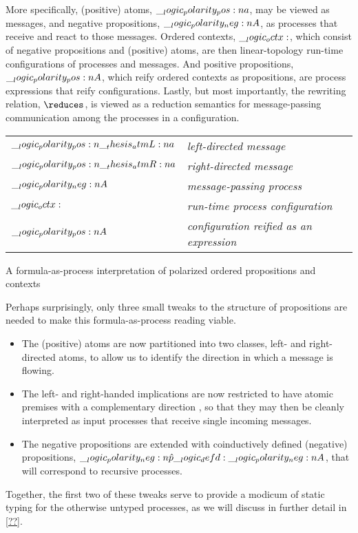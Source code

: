 More specifically,
(positive) atoms, $\__logic_polarity_pos:n {a}$, may be viewed as messages, and negative propositions, $\__logic_polarity_neg:n {A}$, as processes that receive and react to those messages.
Ordered contexts, $\__logic_octx:$, which consist of negative propositions and (positive) atoms, are then linear-topology run-time configurations of processes and messages.
And positive propositions, $\__logic_polarity_pos:n {A}$, which reify ordered contexts as propositions, are process expressions that reify configurations.
Lastly, but most importantly, the rewriting relation, $\reduces$, is viewed as a reduction semantics for message-passing communication among the processes in a configuration.%
\begin{margintable}
  \begin{center}
    \begin{tabular}{@{}l@{\enspace\ }>{\itshape}l@{}}
      $\__logic_polarity_pos:n {\__thesis_atmL:n {a}}$ & left-directed message \\
      $\__logic_polarity_pos:n {\__thesis_atmR:n {a}}$ & right-directed message \\
      $\__logic_polarity_neg:n {A}$ & message-passing process \\
      $\__logic_octx:$ & run-time process configuration \\
      $\__logic_polarity_pos:n {A}$ & configuration reified as an expression
    \end{tabular}
  \end{center}
  \caption{A formula-as-process interpretation of polarized ordered propositions and contexts}\label{fig:choreographies:propctx-table}
\end{margintable}%

Perhaps surprisingly, only three small tweaks to the structure of propositions are needed to make this formula-as-process reading viable.
\begin{itemize}
\item
  The (positive) atoms are now partitioned into two classes, left- and right-directed atoms, to allow us to identify the direction in which a message is flowing.

\item
  The left- and right-handed implications are now restricted to have atomic premises with a complementary direction
  , so that they may then be cleanly interpreted as input processes that receive  single incoming messages.

\item 
  The negative propositions are extended with coinductively defined (negative) propositions, $\__logic_polarity_neg:n {\hat{p}} \__logic_defd: \__logic_polarity_neg:n {A}$, that will correspond to recursive processes.
\end{itemize}
Together, the first two of these tweaks serve to provide a modicum of static typing for the otherwise untyped processes, as we will discuss in further detail in \cref{??}.

